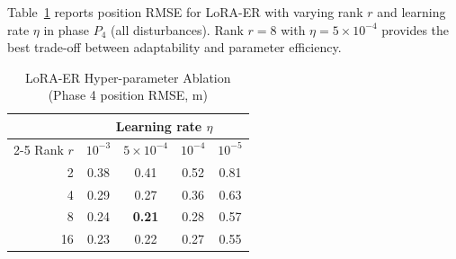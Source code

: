 \documentclass[journal]{IEEEtran}
\begin{document}
Table~\ref{tab:lora_ablation} reports position RMSE for LoRA-ER with
varying rank $r$ and learning rate $\eta$ in phase $P_4$ (all disturbances).
Rank $r=8$ with $\eta = 5\times10^{-4}$ provides the best trade-off
between adaptability and parameter efficiency.

\begin{table}[htbp]
\centering
\caption{LoRA-ER Hyper-parameter Ablation (Phase 4 position RMSE, m)}
\label{tab:lora_ablation}
\begin{tabular}{rcccc}
\toprule
& \multicolumn{4}{c}{Learning rate $\eta$} \\
\cmidrule(lr){2-5}
Rank $r$ & $10^{-3}$ & $5\times10^{-4}$ & $10^{-4}$ & $10^{-5}$ \\
\midrule
2  & 0.38 & 0.41 & 0.52 & 0.81 \\
4  & 0.29 & 0.27 & 0.36 & 0.63 \\
8  & 0.24 & \textbf{0.21} & 0.28 & 0.57 \\
16 & 0.23 & 0.22 & 0.27 & 0.55 \\
\bottomrule
\end{tabular}
\end{table}
\end{document}
